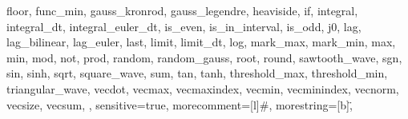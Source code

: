 {{      floor,
      func_min,
      gauss_kronrod,
      gauss_legendre,
      heaviside,
      if,
      integral,
      integral_dt,
      integral_euler_dt,
      is_even,
      is_in_interval,
      is_odd,
      j0,
      lag,
      lag_bilinear,
      lag_euler,
      last,
      limit,
      limit_dt,
      log,
      mark_max,
      mark_min,
      max,
      min,
      mod,
      not,
      prod,
      random,
      random_gauss,
      root,
      round,
      sawtooth_wave,
      sgn,
      sin,
      sinh,
      sqrt,
      square_wave,
      sum,
      tan,
      tanh,
      threshold_max,
      threshold_min,
      triangular_wave,
      vecdot,
      vecmax,
      vecmaxindex,
      vecmin,
      vecminindex,
      vecnorm,
      vecsize,
      vecsum,
},
sensitive=true,
morecomment=[l]{\#},
morestring=[b]\",
}
